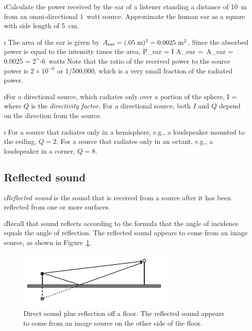 \i \exer Calculate the power received by the ear of
a listener standing a distance of 10~m from an
omni-directional 1~watt source.
Approximate the human ear as a square with side length
of 5~cm.

\i \ans
The area of the ear is given by 
$A_{\rm ear} = (.05~{\rm m})^2 = 0.0025~{\rm m}^2$.
Since the absorbed power is equal to the intensity times
the area,
%
\be
P_{\rm ear} = I A_{\rm ear} 
=\, A_{\rm ear}
= 0.0025
= 2^{-6}~{\rm watts}
\ee
%
Note that the ratio of the received power to the source
power is $2\times 10^{-6}$ or 1/500,000, which is a
very small fraction of the radiated power.

\i For a directional source, which radiates only over a 
portion of the sphere,
%
\be
I = 
\ee
%
where $Q$ is the {\em directivity factor}.
For a directional source, both $I$ and $Q$ depend on 
the direction from the source.
 
\i \ex
For a source that radiates only in a hemisphere, e.g.,
a loudspeaker mounted to the ceiling, $Q=2$.
For a source that radiates only in an octant, e.g., 
a loudspeaker in a corner, $Q=8$.

\ei
\subsection{Reflected sound}
\bi

\i {\em Reflected sound} is the sound that is received 
from a source after it has been reflected from one or more surfaces.

\i Recall that sound reflects according to the formula that
the angle of incidence equals the angle of reflection.
The reflected sound appears to come from an image source, as shown
in Figure~\ref{f:reflection_floor}.
%
\begin{figure}[htbp]
\begin{center}
\includegraphics[width=0.7\textwidth]{reflection_floor}
\caption{Direct sound plus reflection off a floor.
The reflected sound appears to come from an image
source on the other side of the floor.}
\label{f:reflection_floor}
\end{center}
\end{figure}
%

